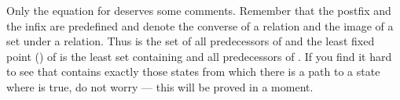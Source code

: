 \begin{isabellebody}
\begin{isamarkuptext}%
\noindent
Only the equation for  deserves some comments. Remember that the
postfix  and the infix  are predefined and denote the
converse of a relation and the image of a set under a relation.  Thus
 is the set of all predecessors of  and the least
fixed point () of  is the least set
 containing  and all predecessors of . If you
find it hard to see that  contains exactly those states from
which there is a path to a state where  is true, do not worry --- this
will be proved in a moment.


\end{isamarkuptext}
\end{isabellebody}

